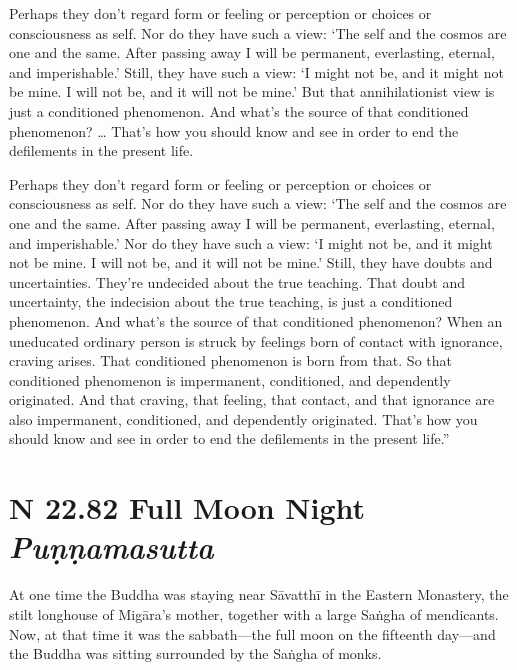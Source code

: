 \documentclass[12pt,openany]{book}%
\newcommand*{\suttatitleacronym}[1]{\smaller[2]{#1}\vspace*{.3em}}
\newcommand*{\suttatitletranslation}[1]{\linebreak{#1}}
\newcommand*{\suttatitleroot}[1]{\linebreak\smaller[2]\itshape{#1}}
\newcommand*{\tocacronym}[1]{\hspace*{-3.3em}{#1}\quad}
\newcommand*{\toctranslation}[1]{#1}
\newcommand*{\tocroot}[1]{(\textit{#1})}
\begin{document}
Perhaps they don’t regard form or feeling or perception or choices or consciousness as self. Nor do they have such a view: ‘The self and the cosmos are one and the same. After passing away I will be permanent, everlasting, eternal, and imperishable.’ Still, they have such a view: ‘I might not be, and it might not be mine. I will not be, and it will not be mine.’ But that annihilationist view is just a conditioned phenomenon. And what’s the source of that conditioned phenomenon? … That’s how you should know and see in order to end the defilements in the present life. 

Perhaps they don’t regard form or feeling or perception or choices or consciousness as self. Nor do they have such a view: ‘The self and the cosmos are one and the same. After passing away I will be permanent, everlasting, eternal, and imperishable.’ Nor do they have such a view: ‘I might not be, and it might not be mine. I will not be, and it will not be mine.’ Still, they have doubts and uncertainties. They’re undecided about the true teaching. That doubt and uncertainty, the indecision about the true teaching, is just a conditioned phenomenon. And what’s the source of that conditioned phenomenon? When an uneducated ordinary person is struck by feelings born of contact with ignorance, craving arises. That conditioned phenomenon is born from that. So that conditioned phenomenon is impermanent, conditioned, and dependently originated. And that craving, that feeling, that contact, and that ignorance are also impermanent, conditioned, and dependently originated. That’s how you should know and see in order to end the defilements in the present life.” 

%
\section*{{\suttatitleacronym SN 22.82}{\suttatitletranslation A Full Moon Night }{\suttatitleroot Puṇṇamasutta}}
\addcontentsline{toc}{section}{\tocacronym{SN 22.82} \toctranslation{A Full Moon Night } \tocroot{Puṇṇamasutta}}

At one time the Buddha was staying near \textsanskrit{Sāvatthī} in the Eastern Monastery, the stilt longhouse of \textsanskrit{Migāra}’s mother, together with a large \textsanskrit{Saṅgha} of mendicants. Now, at that time it was the sabbath—the full moon on the fifteenth day—and the Buddha was sitting surrounded by the \textsanskrit{Saṅgha} of monks. 
\end{document}
